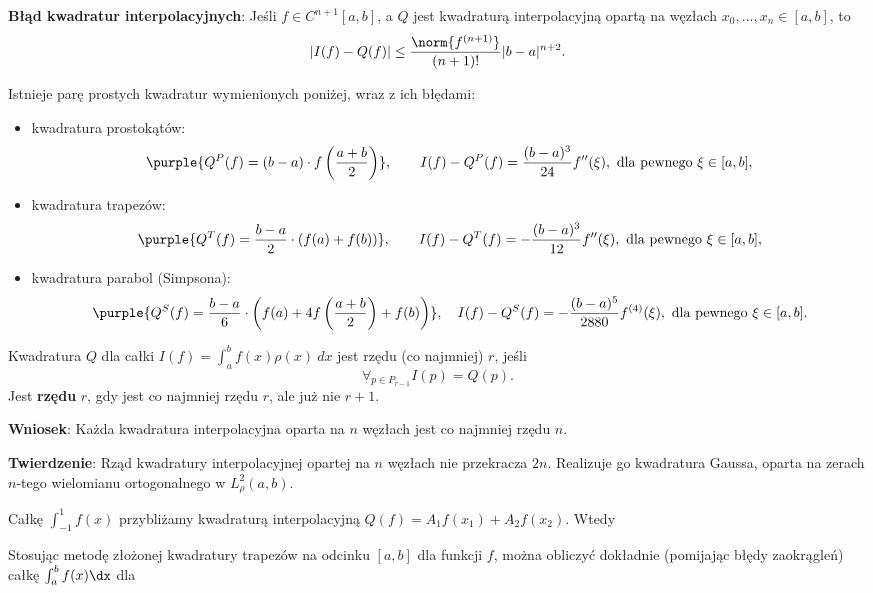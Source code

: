 \textbf{Błąd kwadratur interpolacyjnych}:
Jeśli $f\in C^{n+1}[a,b]$, a $Q$ jest kwadraturą interpolacyjną opartą na węzłach $x_0,\ldots,x_n\in[a,b]$, to
$$
|I(f)-Q(f)| \leq \frac{\norm{f^{(n+1)}}}{(n+1)!}|b-a|^{n+2}.
$$

Istnieje parę prostych kwadratur wymienionych poniżej, wraz z ich błędami:
\begin{itemize}
    \item kwadratura prostokątów:
    $$
    \purple{Q^P(f) = (b-a)\cdot f\left(\frac{a+b}{2}\right)}, \qquad I(f) - Q^P(f) = \frac{(b-a)^3}{24}f''(\xi), \text{ dla pewnego } \xi\in[a,b],
    $$
    \item kwadratura trapezów:
    $$
    \purple{Q^T(f) = \frac{b-a}{2}\cdot(f(a)+f(b))}, \qquad I(f) - Q^T(f) = -\frac{(b-a)^3}{12}f''(\xi), \text{ dla pewnego } \xi\in[a,b],
    $$
    \item kwadratura parabol (Simpsona):
    $$
   \purple{ Q^S(f) = \frac{b-a}{6}\cdot\left(f(a)+4f\left(\frac{a+b}{2}\right)+f(b)\right)}, \quad I(f) - Q^S(f) = -\frac{(b-a)^5}{2880}f^{(4)}(\xi), \text{ dla pewnego } \xi\in[a,b].
    $$
\end{itemize}

Kwadratura $Q$ dla całki $I(f) = \int_a^b f(x)\rho(x)\ dx$ jest rzędu (co najmniej) $r$, jeśli
$$
\forall_{p\in P_{r-1}} I(p)=Q(p).
$$
Jest \textbf{rzędu} $r$, gdy jest co najmniej rzędu $r$, ale już nie $r+1$.

\textbf{Wniosek}:
Każda kwadratura interpolacyjna oparta na $n$ węzłach jest co najmniej rzędu $n$.

\textbf{Twierdzenie}:
Rząd kwadratury interpolacyjnej opartej na $n$ węzłach nie przekracza $2n$. Realizuje go kwadratura Gaussa, oparta na zerach $n$-tego wielomianu ortogonalnego w $L_\rho^2(a,b)$.

\begin{problems}
    \prob Całkę $\int_{-1}^{1} f(x)$ przybliżamy kwadraturą interpolacyjną $Q(f) = A_1f(x_1)+A_2f(x_2)$. Wtedy

    \prob Stosując metodę złożonej kwadratury trapezów na odcinku $[a, b]$ dla funkcji $f$, można obliczyć dokładnie (pomijając błędy zaokrągleń) całkę $\int_{a}^{b} f(x) \dx$ dla
\end{problems}

